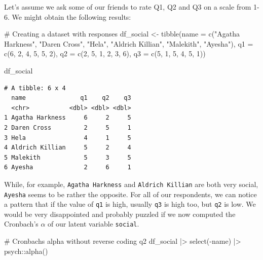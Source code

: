 \documentclass[
  letterpaper,
]{krantz}
\makeatletter
\newenvironment{Shaded}{\begin{snugshade}}{\end{snugshade}}
\newcommand{\AttributeTok}[1]{\textcolor[rgb]{0.40,0.45,0.13}{#1}}
\newcommand{\CommentTok}[1]{\textcolor[rgb]{0.37,0.37,0.37}{#1}}
\newcommand{\DecValTok}[1]{\textcolor[rgb]{0.68,0.00,0.00}{#1}}
\newcommand{\FunctionTok}[1]{\textcolor[rgb]{0.28,0.35,0.67}{#1}}
\newcommand{\NormalTok}[1]{\textcolor[rgb]{0.00,0.23,0.31}{#1}}
\newcommand{\OtherTok}[1]{\textcolor[rgb]{0.00,0.23,0.31}{#1}}
\newcommand{\SpecialCharTok}[1]{\textcolor[rgb]{0.37,0.37,0.37}{#1}}
\newcommand{\StringTok}[1]{\textcolor[rgb]{0.13,0.47,0.30}{#1}}
\newenvironment{kframe}{%
\medskip{}
\setlength{\fboxsep}{.8em}
 \def\at@end@of@kframe{}%
 \ifinner\ifhmode%
  \def\at@end@of@kframe{\end{minipage}}%
  \begin{minipage}{\columnwidth}%
 \fi\fi%
 \def\FrameCommand##1{\hskip\@totalleftmargin \hskip-\fboxsep
 \colorbox{shadecolor}{##1}\hskip-\fboxsep
     \hskip-\linewidth \hskip-\@totalleftmargin \hskip\columnwidth}%
 \MakeFramed {\advance\hsize-\width
   \@totalleftmargin\z@ \linewidth\hsize
   \@setminipage}}%
 {\par\unskip\endMakeFramed%
 \at@end@of@kframe}
\renewenvironment{Shaded}{\begin{kframe}}{\end{kframe}}
\makeatother
\begin{document}
Let's assume we ask some of our friends to rate Q1, Q2 and Q3 on a scale
from 1-6. We might obtain the following results:

\begin{Shaded}
\begin{Highlighting}[]
\CommentTok{\# Creating a dataset with responses}
\NormalTok{df\_social }\OtherTok{\textless{}{-}} \FunctionTok{tibble}\NormalTok{(}\AttributeTok{name =} \FunctionTok{c}\NormalTok{(}\StringTok{"Agatha Harkness"}\NormalTok{, }\StringTok{"Daren Cross"}\NormalTok{,}
                             \StringTok{"Hela"}\NormalTok{, }\StringTok{"Aldrich Killian"}\NormalTok{,}
                             \StringTok{"Malekith"}\NormalTok{, }\StringTok{"Ayesha"}\NormalTok{),}
                    \AttributeTok{q1 =} \FunctionTok{c}\NormalTok{(}\DecValTok{6}\NormalTok{, }\DecValTok{2}\NormalTok{, }\DecValTok{4}\NormalTok{, }\DecValTok{5}\NormalTok{, }\DecValTok{5}\NormalTok{, }\DecValTok{2}\NormalTok{),}
                    \AttributeTok{q2 =} \FunctionTok{c}\NormalTok{(}\DecValTok{2}\NormalTok{, }\DecValTok{5}\NormalTok{, }\DecValTok{1}\NormalTok{, }\DecValTok{2}\NormalTok{, }\DecValTok{3}\NormalTok{, }\DecValTok{6}\NormalTok{),}
                    \AttributeTok{q3 =} \FunctionTok{c}\NormalTok{(}\DecValTok{5}\NormalTok{, }\DecValTok{1}\NormalTok{, }\DecValTok{5}\NormalTok{, }\DecValTok{4}\NormalTok{, }\DecValTok{5}\NormalTok{, }\DecValTok{1}\NormalTok{))}

\NormalTok{df\_social}
\end{Highlighting}
\end{Shaded}

\begin{verbatim}
# A tibble: 6 x 4
  name               q1    q2    q3
  <chr>           <dbl> <dbl> <dbl>
1 Agatha Harkness     6     2     5
2 Daren Cross         2     5     1
3 Hela                4     1     5
4 Aldrich Killian     5     2     4
5 Malekith            5     3     5
6 Ayesha              2     6     1
\end{verbatim}

While, for example, \texttt{Agatha\ Harkness} and
\texttt{Aldrich\ Killian} are both very social, \texttt{Ayesha} seems to
be rather the opposite. For all of our respondents, we can notice a
pattern that if the value of \texttt{q1} is high, usually \texttt{q3} is
high too, but \texttt{q2} is low. We would be very disappointed and
probably puzzled if we now computed the Cronbach's \(\alpha\) of our
latent variable \texttt{social}.

\begin{Shaded}
\begin{Highlighting}[]
\CommentTok{\# Cronbach\textquotesingle{}s alpha without reverse coding q2}
\NormalTok{df\_social }\SpecialCharTok{|\textgreater{}}
  \FunctionTok{select}\NormalTok{(}\SpecialCharTok{{-}}\NormalTok{name) }\SpecialCharTok{|\textgreater{}}
\NormalTok{  psych}\SpecialCharTok{::}\FunctionTok{alpha}\NormalTok{()}
\end{Highlighting}
\end{Shaded}
\end{document}
